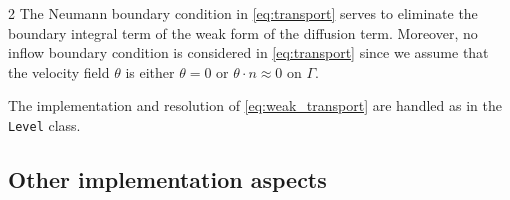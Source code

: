 \documentclass[a4paper, oneside]{article}
\newcommand{\code}[1]{\texttt{#1}}
\begin{document}
\begin{multicols}{2}
The Neumann boundary condition in \eqref{eq:transport} serves to eliminate
the boundary integral term of the weak form of the diffusion term.
Moreover, no inflow boundary condition is considered in \eqref{eq:transport}
since we assume that the velocity field $\theta$ is either $\theta = 0$ 
or $\theta \cdot n \approx 0$ on $\Gamma$.

The implementation and resolution of \eqref{eq:weak_transport} are handled
as in the \code{Level} class. 

\subsection{Other implementation aspects}
\label{sub:other}


\end{multicols}
\end{document}
